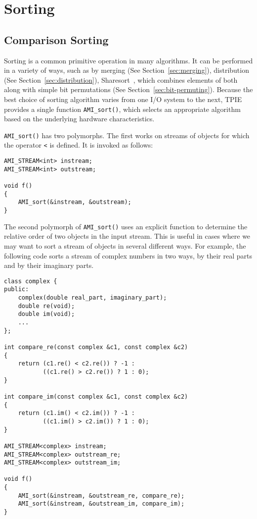 \section{Sorting}

\subsection{Comparison Sorting} \label{sec:cmp-sorting}

Sorting is a common primitive operation in many algorithms.  It can be
performed in a variety of ways, such as by merging (See
Section~\ref{sec:merging}), distribution (See
Section~\ref{sec:distribution}), Sharesort~\cite{aggarwal:optimal},
which combines elements of both along with simple bit permutations
(See Section~\ref{sec:bit-permuting}).  Because the best choice of
sorting algorithm varies from one I/O system to the next, TPIE
provides a single function \verb|AMI_sort()|, which selects an
appropriate algorithm based on the underlying hardware
characteristics.

\verb|AMI_sort()| has two polymorphs.  The first works on streams of
objects for which the operator \verb|<| is defined.  It is invoked as
follows:

\begin{verbatim}
AMI_STREAM<int> instream;
AMI_STREAM<int> outstream;

void f()
{
    AMI_sort(&instream, &outstream);
}
\end{verbatim}

The second polymorph of \verb|AMI_sort()| uses an explicit function to
determine the relative order of two objects in the input stream.  This
is useful in cases where we may want to sort a stream of objects in
several different ways.  For example, the following code sorts a
stream of complex numbers in two ways, by their real parts and by
their imaginary parts.

\begin{verbatim}
class complex {
public:
    complex(double real_part, imaginary_part);
    double re(void);
    double im(void);
    ...
};

int compare_re(const complex &c1, const complex &c2)
{
    return (c1.re() < c2.re()) ? -1 :
           ((c1.re() > c2.re()) ? 1 : 0);
}

int compare_im(const complex &c1, const complex &c2)
{
    return (c1.im() < c2.im()) ? -1 :
           ((c1.im() > c2.im()) ? 1 : 0);
}

AMI_STREAM<complex> instream;
AMI_STREAM<complex> outstream_re;
AMI_STREAM<complex> outstream_im;

void f()
{
    AMI_sort(&instream, &outstream_re, compare_re);
    AMI_sort(&instream, &outstream_im, compare_im);
}
\end{verbatim}

